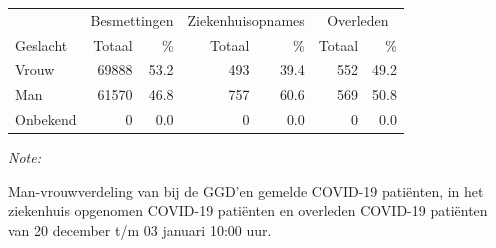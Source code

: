 \documentclass[
  english,
  man,floatsintext]{apa6}
\begin{document}
\begin{table}[H]
\centering\begingroup\fontsize{11}{13}\selectfont

\begin{threeparttable}
\begin{tabular}{lrrrrrr}
\toprule
\multicolumn{1}{c}{ } & \multicolumn{2}{c}{Besmettingen} & \multicolumn{2}{c}{Ziekenhuisopnames} & \multicolumn{2}{c}{Overleden} \\
\cmidrule(l{3pt}r{3pt}){2-3} \cmidrule(l{3pt}r{3pt}){4-5} \cmidrule(l{3pt}r{3pt}){6-7}
Geslacht & Totaal & \% & Totaal & \% & Totaal & \%\\
\midrule
Vrouw & 69888 & 53.2 & 493 & 39.4 & 552 & 49.2\\
Man & 61570 & 46.8 & 757 & 60.6 & 569 & 50.8\\
Onbekend & 0 & 0.0 & 0 & 0.0 & 0 & 0.0\\
\bottomrule
\end{tabular}
\begin{tablenotes}
\item \textit{Note: } 
\item Man-vrouwverdeling van bij de GGD’en gemelde COVID-19 patiënten, in het ziekenhuis opgenomen COVID-19 patiënten en overleden COVID-19 patiënten van 20 december t/m 03 januari 10:00 uur.
\end{tablenotes}
\end{threeparttable}
\endgroup{}
\end{table}
\newpage
\end{document}
